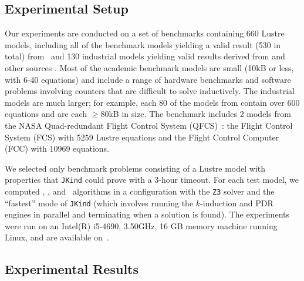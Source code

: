 \subsection{Experimental Setup}

Our experiments are conducted on a set of benchmarks containing 660 Lustre models, including all of the benchmark models yielding a valid result (530 in total) from~\cite{Hagen08:FMCAD, piskac2016} and 130 industrial models yielding valid results derived from \cite{hilt2013} and other sources \cite{piskac2016, NFM2015:backes}.  
Most of the academic benchmark models are small (10kB or less, with 6-40 equations) and include a range of hardware benchmarks and software problems involving counters that are difficult to solve inductively.
The industrial models are much larger; for example, each 80 of the models from \cite{hilt2013} contain over 600 equations and are each $\geq$80kB in size. The benchmark includes 2 models from the NASA Quad-redundant Flight Control System (QFCS)~\cite{NFM2015:backes}: the Flight Control System (FCS) with 5259 Lustre equations and the Flight Control Computer (FCC) with 10969 equations.

We selected only benchmark problems consisting of a Lustre model with
properties that \texttt{JKind} could prove with a 3-hour timeout.
For each test model, we computed \aivcalg, \ucalg, and \ucbfalg ~algorithms in a configuration with the \texttt{Z3} solver and the ``fastest'' mode of \texttt{JKind} (which involves running the $k$-induction and PDR engines in parallel and terminating when a solution is found). The experiments were run on an  Intel(R) i5-4690, 3.50GHz, 16 GB memory machine running Linux, and are available on~\cite{expr}.%



\subsection{Experimental Results}

 
